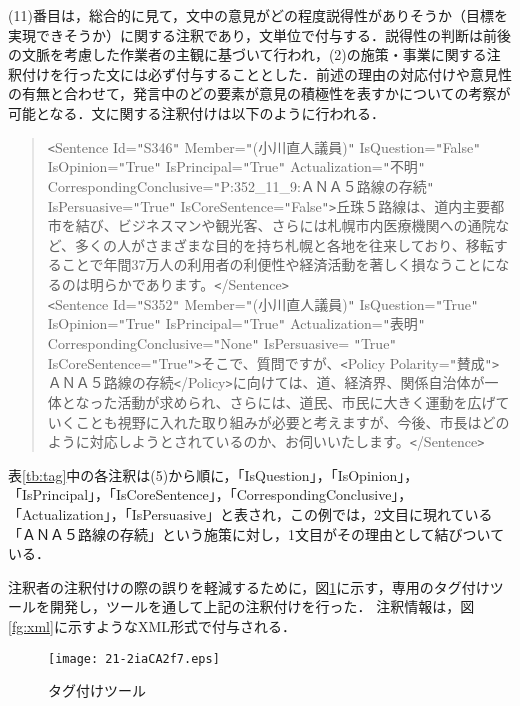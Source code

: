 \documentclass[japanese]{jnlp_1.4}
\begin{document}
(11)番目は，総合的に見て，文中の意見がどの程度説得性がありそうか（目標を実現できそうか）に関する注釈であり，文単位で付与する．説得性の判断は前後の文脈を考慮した作業者の主観に基づいて行われ，(2)の施策・事業に関する注釈付けを行った文には必ず付与することとした．前述の理由の対応付けや意見性の有無と合わせて，発言中のどの要素が意見の積極性を表すかについての考察が可能となる．文に関する注釈付けは以下のように行われる．
\begin{quote}
\texttt{<}Sentence Id=\verb/"/S346\verb/"/ Member=\verb/"/(小川直人議員)\verb/"/ IsQuestion=\verb/"/False\verb/"/ IsOpinion=\verb/"/True\verb/"/ IsPrincipal=\verb/"/True\verb/"/ Actualization=\verb/"/不明\verb/"/ CorrespondingConclusive=\verb/"/P:352\_11\_9:ＡＮＡ５路線の存続\verb/"/ IsPersuasive=\verb/"/True\verb/"/ IsCoreSentence=\verb/"/False\verb/"/\texttt{>}丘珠５路線は、道内主要都市を結び、ビジネスマンや観光客、さらには札幌市内医療機関への通院など、多くの人がさまざまな目的を持ち札幌と各地を往来しており、移転することで年間37万人の利用者の利便性や経済活動を著しく損なうことになるのは明らかであります。\texttt{<}/Sentence\texttt{>}\\
\texttt{<}Sentence Id=\verb/"/S352\verb/"/ Member=\verb/"/(小川直人議員)\verb/"/ IsQuestion=\verb/"/True\verb/"/ IsOpinion=\verb/"/True\verb/"/ IsPrincipal=\verb/"/True\verb/"/ Actualization=\verb/"/表明\verb/"/ CorrespondingConclusive=\verb/"/None\verb/"/ IsPersuasive= 
\linebreak
\verb/"/True\verb/"/ IsCoreSentence=\verb/"/True\verb/"/\texttt{>}そこで、質問ですが、\texttt{<}Policy Polarity=\verb/"/賛成\verb/"/\texttt{>}ＡＮＡ５路線の存続\texttt{<}/Policy\texttt{>}に向けては、道、経済界、関係自治体が一体となった活動が求められ、さらには、道民、市民に大きく運動を広げていくことも視野に入れた取り組みが必要と考えますが、今後、市長はどのように対応しようとされているのか、お伺いいたします。\texttt{<}/Sentence\texttt{>}
\end{quote}

表\ref{tb:tag}中の各注釈は(5)から順に，「IsQuestion」，「IsOpinion」，「IsPrincipal」，「IsCoreSentence」，「CorrespondingConclusive」，「Actualization」，「IsPersuasive」と表され，この例では，2文目に現れている「ＡＮＡ５路線の存続」という施策に対し，1文目がその理由として結びついている．

注釈者の注釈付けの際の誤りを軽減するために，図\ref{fg:tool}に示す，専用のタグ付けツールを開発し，ツールを通して上記の注釈付けを行った．
注釈情報は，図\ref{fg:xml}に示すようなXML形式で付与される．

\begin{figure}[t]
 \begin{center}
 \texttt{[image: 21-2iaCA2f7.eps]}
 \end{center}
 \caption{タグ付けツール}
 \label{fg:tool}
\end{figure}
\end{document}
